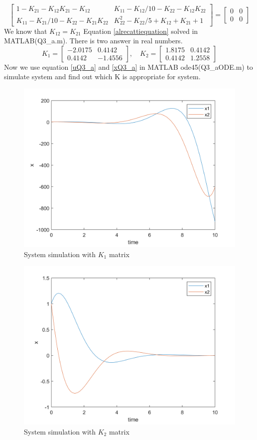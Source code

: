 $$
 \begin{bmatrix}\label{alrecattiequation}
	1 - K_{21} - K_{12}K_{21} - K_{12} &  K_{11} - K_{12}/10 - K_{22} - K_{12}K_{22} \\
	K_{11} - K_{21}/10 - K_{22} - K_{21}K_{22} & K_{22}^2 - K_{22}/5 + K_{12} + K_{21} + 1
\end{bmatrix} 
= \begin{bmatrix}
	0 & 0\\0 &0
\end{bmatrix}
$$
We know that $K_{12} = K_{21}$
Equation \ref{alrecattiequation} solved in MATLAB(Q3\_a.m).
There is two answer in real numbers.
$$K_1 = \begin{bmatrix} 
	-2.0175&  0.4142\\
	0.4142& -1.4556
\end{bmatrix}, \quad K_2 = \begin{bmatrix} 
1.8175&  0.4142\\
0.4142& 1.2558
\end{bmatrix}$$
Now we use equation \ref{uQ3_a} and \ref{xQ3_a} in MATLAB ode45(Q3\_aODE.m) to simulate system and find out which K is appropriate for system.
\begin{figure}[H]
	\caption{System simulation with $K_1$ matrix}
	\centering
	\includegraphics[width=12cm]{../Code/Q3/figures/K1ODE.png}
\end{figure}
\begin{figure}[H]
	\caption{System simulation with $K_2$ matrix}
	\centering
	\includegraphics[width=12cm]{../Code/Q3/figures/K2ODE.png}
\end{figure}